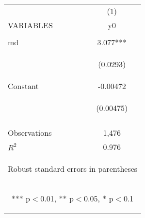 \begin{center}
\begin{tabular}{lc} \hline
 & (1) \\
VARIABLES & y0 \\ \hline
\vspace{4pt} & \begin{footnotesize}\end{footnotesize} \\
md & 3.077*** \\
\vspace{4pt} & \begin{footnotesize}(0.0293)\end{footnotesize} \\
Constant & -0.00472 \\
 & \begin{footnotesize}(0.00475)\end{footnotesize} \\
\vspace{4pt} & \begin{footnotesize}\end{footnotesize} \\
Observations & 1,476 \\
 $R^2$ & 0.976 \\ \hline
\multicolumn{2}{c}{\begin{footnotesize} Robust standard errors in parentheses\end{footnotesize}} \\
\multicolumn{2}{c}{\begin{footnotesize} *** p$<$0.01, ** p$<$0.05, * p$<$0.1\end{footnotesize}} \\
\end{tabular}
\end{center}
